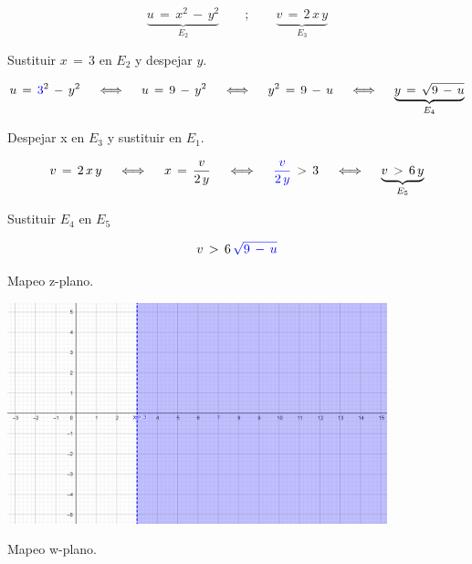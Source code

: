 \documentclass[a4paper,11pt,openany]{book}
\begin{document}
$$\underbrace{u\,=\,x^{2}\,-\,y^{2}}_{E_{2}} \qquad;\qquad \underbrace{v\,=\,2\,x\,y}_{E_{3}}$$

\textcolor{ao(english)}{} Sustituir $x\,=\,3$ en $E_{2}$ y despejar $y$.

$$u\,=\,\textcolor{ao}{3}^{2}\,-\,y^{2} \quad\iff\quad u\,=\,9\,-\,y^{2} \quad\iff\quad y^{2}\,=\,9\,-\,u \quad\iff\quad \underbrace{y\,=\,\sqrt{9\,-\,u}}_{E_{4}}$$

\textcolor{ao(english)}{} Despejar x en $E_{3}$ y sustituir en $E_{1}$.

$$v\,=\,2\,x\,y \quad\iff\quad x\,=\,\dfrac{v}{2\,y} \quad\iff\quad \textcolor{ao}{\dfrac{v}{2\,y}}\,>\,3 \quad\iff\quad \underbrace{v\,>\,6\,y}_{E_{5}}$$

\textcolor{ao(english)}{} Sustituir $E_{4}$ en $E_{5}$

$$v\,>\,6\,\textcolor{ao}{\sqrt{9\,-\,u}}$$

\textcolor{ao(english)}{} Mapeo z-plano.

\begin{center}
     \includegraphics[width=11cm]{Mapeo-Ej-5-z.png}
\end{center}

\textcolor{ao(english)}{} Mapeo w-plano.
\end{document}

